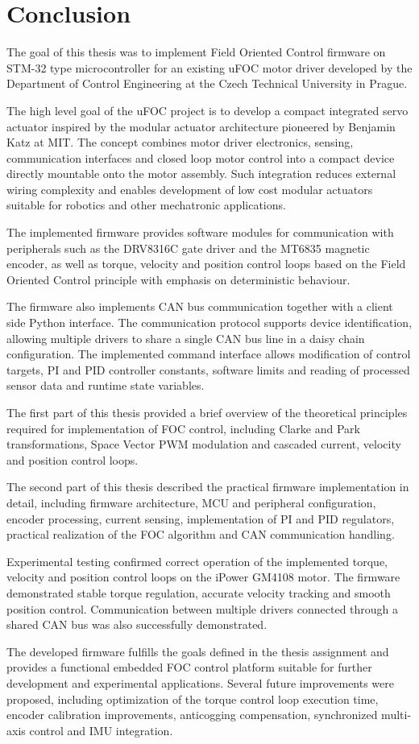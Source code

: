 \chapter{Conclusion}

The goal of this thesis was to implement Field Oriented Control firmware on STM-32 type microcontroller for an existing uFOC motor driver 
developed by the Department of Control Engineering at the Czech Technical University in Prague.

The high level goal of the uFOC project is to develop a compact integrated servo actuator inspired by the modular actuator architecture pioneered by Benjamin Katz at MIT. \cite{ben_katz}
The concept combines motor driver electronics, sensing, communication interfaces and closed loop motor control into a compact device directly mountable onto the motor assembly. 
Such integration reduces external wiring complexity and enables development of low cost modular actuators suitable for robotics and other mechatronic applications.

The implemented firmware provides software modules for communication with peripherals such as the DRV8316C gate driver and the MT6835 magnetic encoder, 
as well as torque, velocity and position control loops based on the Field Oriented Control principle with emphasis on deterministic behaviour.

The firmware also implements CAN bus communication together with a client side Python interface.
The communication protocol supports device identification, allowing multiple drivers to share a single CAN bus line in a daisy chain configuration. 
The implemented command interface allows modification of control targets, PI and PID controller constants, 
software limits and reading of processed sensor data and runtime state variables.

The first part of this thesis provided a brief overview of the theoretical principles required for implementation of FOC control, 
including Clarke and Park transformations, Space Vector PWM modulation and cascaded current, velocity and position control loops.

The second part of this thesis described the practical firmware implementation in detail, including firmware architecture, MCU and peripheral configuration, 
encoder processing, current sensing, implementation of PI and PID regulators, practical realization of the FOC algorithm and CAN communication handling.

Experimental testing confirmed correct operation of the implemented torque, velocity and position control loops on the iPower GM4108 motor. 
The firmware demonstrated stable torque regulation, accurate velocity tracking and smooth position control. 
Communication between multiple drivers connected through a shared CAN bus was also successfully demonstrated.

The developed firmware fulfills the goals defined in the thesis assignment and provides a functional embedded
FOC control platform suitable for further development and experimental applications. 
Several future improvements were proposed, including optimization of the torque control loop execution time, 
encoder calibration improvements, anticogging compensation, synchronized multi-axis control and IMU integration.
